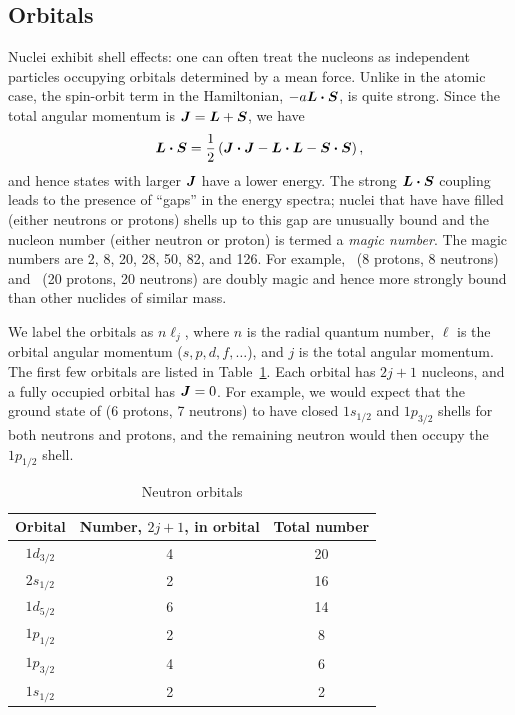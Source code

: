 \subsection{Orbitals}
Nuclei exhibit shell effects: one can often treat the nucleons as independent particles occupying orbitals determined by a mean force.  Unlike in the atomic case, the spin-orbit term in the Hamiltonian, $-a\boldsymbol{L}\boldsymbol{\cdot}\boldsymbol{S}$, is quite strong. Since the total angular momentum is $\boldsymbol{J}=\boldsymbol{L}+\boldsymbol{S}$, we have 
\[
\boldsymbol{L}\boldsymbol{\cdot}\boldsymbol{S} = \frac{1}{2}\left(\boldsymbol{J}\boldsymbol{\cdot}\boldsymbol{J} - \boldsymbol{L}\boldsymbol{\cdot}\boldsymbol{L} - \boldsymbol{S}\boldsymbol{\cdot}\boldsymbol{S}\right),
\]
and hence states with larger $\boldsymbol{J}$ have a lower energy. The strong $\boldsymbol{L}\boldsymbol{\cdot}\boldsymbol{S}$ coupling leads to the presence of ``gaps'' in the energy spectra; nuclei that have have filled (either neutrons or protons) shells up to this gap are unusually bound and the nucleon number (either neutron or proton) is termed a \emph{magic number}. The magic numbers are 2, 8, 20, 28, 50, 82, and 126. For example, \oxygen\ (8 protons, 8 neutrons) and \calcium\ (20 protons, 20 neutrons) are doubly magic and hence more strongly bound than other nuclides of similar mass.

We label the orbitals as $n\ell_{j}$, where $n$ is the radial quantum number, $\ell$ is the orbital angular momentum ($s,p,d,f,\ldots$), and $j$ is the total angular momentum.  The first few orbitals are listed in Table~\ref{t.orbitals}.  Each orbital has $2j+1$ nucleons, and a fully occupied orbital has $\boldsymbol{J}=0$. For example, we would expect that the ground state of \carbon[13] (6 protons, 7 neutrons) to have closed $1s_{1/2}$ and $1p_{3/2}$ shells for both neutrons and protons, and the remaining neutron would then occupy the $1p_{1/2}$ shell.

\begin{table}[htbp]
\caption{\label{t.orbitals} Neutron orbitals}
\begin{center}
\begin{tabular}{ccc}
\hline
Orbital & Number, $2j+1$, in orbital & Total number\\
\hline\hline
$1d_{3/2}$ & 4 & 20\\
$2s_{1/2}$ & 2 & 16\\
$1d_{5/2}$ & 6 & 14\\
$1p_{1/2}$ & 2 & 8\\
$1p_{3/2}$ & 4 & 6\\
$1s_{1/2}$ & 2 & 2\\
\hline
\end{tabular}
\end{center}
\end{table}


